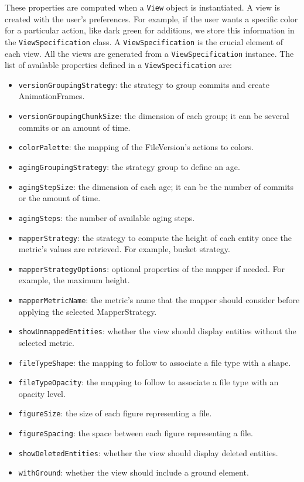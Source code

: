 These properties are computed when a \texttt{View} object is instantiated. A view is created with the user's preferences. 
For example, if the user wants a specific color for a particular action, like dark green for additions, we store this information in the \texttt{ViewSpecification} class. A \texttt{ViewSpecification} is the crucial element of each view. 
All the views are generated from a \texttt{ViewSpecification} instance. The list of available properties defined in a \texttt{ViewSpecification} are:
\begin{itemize}
    \item \texttt{versionGroupingStrategy}: the strategy to group commits and create AnimationFrames.
    \item \texttt{versionGroupingChunkSize}: the dimension of each group; it can be several commits or an amount of time. 
    \item \texttt{colorPalette}: the mapping of the FileVersion's actions to colors. 
    \item \texttt{agingGroupingStrategy}: the strategy group to define an age.
    \item \texttt{agingStepSize}: the dimension of each age; it can be the number of commits or the amount of time. 
    \item \texttt{agingSteps}: the number of available aging steps. 
    \item \texttt{mapperStrategy}: the strategy to compute the height of each entity once the metric's values are retrieved. For example, bucket strategy. 
    \item \texttt{mapperStrategyOptions}: optional properties of the mapper if needed. For example, the maximum height. 
    \item \texttt{mapperMetricName}: the metric's name that the mapper should consider before applying the selected MapperStrategy. 
    \item \texttt{showUnmappedEntities}: whether the view should display entities without the selected metric.
    \item \texttt{fileTypeShape}: the mapping to follow to associate a file type with a shape.
    \item \texttt{fileTypeOpacity}: the mapping to follow to associate a file type with an opacity level.
    \item \texttt{figureSize}: the size of each figure representing a file.
    \item \texttt{figureSpacing}: the space between each figure representing a file.
    \item \texttt{showDeletedEntities}: whether the view should display deleted entities.
    \item \texttt{withGround}: whether the view should include a ground element.
\end{itemize}

